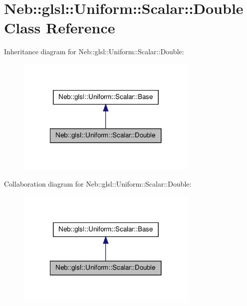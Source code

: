 \hypertarget{classNeb_1_1glsl_1_1Uniform_1_1Scalar_1_1Double}{\section{\-Neb\-:\-:glsl\-:\-:\-Uniform\-:\-:\-Scalar\-:\-:\-Double \-Class \-Reference}
\label{classNeb_1_1glsl_1_1Uniform_1_1Scalar_1_1Double}
}


\-Inheritance diagram for \-Neb\-:\-:glsl\-:\-:\-Uniform\-:\-:\-Scalar\-:\-:\-Double\-:\nopagebreak
\begin{figure}[H]
\begin{center}
\leavevmode
\includegraphics[width=246pt]{classNeb_1_1glsl_1_1Uniform_1_1Scalar_1_1Double__inherit__graph}
\end{center}
\end{figure}


\-Collaboration diagram for \-Neb\-:\-:glsl\-:\-:\-Uniform\-:\-:\-Scalar\-:\-:\-Double\-:\nopagebreak
\begin{figure}[H]
\begin{center}
\leavevmode
\includegraphics[width=246pt]{classNeb_1_1glsl_1_1Uniform_1_1Scalar_1_1Double__coll__graph}
\end{center}
\end{figure}
